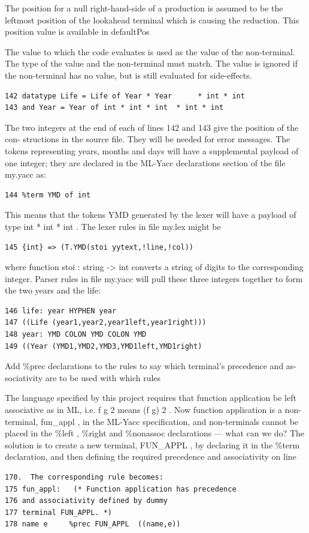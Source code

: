 \documentclass[8pt, a4paper, oneside, twocolumn]{extarticle}
\begin{document}
The position for a null right-hand-side of a production is assumed to be the leftmost
position of the lookahead terminal which is causing the reduction.  This position value
is available in
defaultPos

The  value  to  which  the  code  evaluates  is  used  as  the  value  of  the  non-terminal.
The type of the value and the non-terminal must match.  The value is ignored if the
non-terminal has no value, but is still evaluated for side-effects.

\begin{verbatim}
142 datatype Life = Life of Year * Year      * int * int
143 and Year = Year of int * int * int  * int * int
\end{verbatim}
The two integers at the end of each of lines 142 and 143 give the position of the con-
structions in the source file.  They will be needed for error messages.
The tokens representing years, months and days will have a supplemental payload
of one integer; they are declared in the ML-Yacc declarations section of the file
my.yacc
as:
\begin{verbatim}
144 %term YMD of int
\end{verbatim}
This means that the tokens
YMD
generated by the lexer will have a payload of type
int
* int * int
.  The lexer rules in file
my.lex
might be
\begin{verbatim}
145 {int} => (T.YMD(stoi yytext,!line,!col))
\end{verbatim}
where function
stoi :  string -> int
converts a string of digits to the corresponding
integer.
Parser rules in file
my.yacc
will pull these three integers together to form the two
years and the life:
\begin{verbatim}
146 life: year HYPHEN year
147 ((Life (year1,year2,year1left,year1right)))
148 year: YMD COLON YMD COLON YMD
149 ((Year (YMD1,YMD2,YMD3,YMD1left,YMD1right)
\end{verbatim}


Add
\%prec
declarations to the rules to say which terminal’s precedence and as-
sociativity  are  to  be  used  with  which  rules

The language specified by this project requires that function application be left
associative  as  in  ML, i.e.
f g 2
means
(f g) 2
.   Now  function  application  is  a
non-terminal,
fun\_appl
, in the ML-Yacc specification, and non-terminals cannot
be placed in the
\%left
,
\%right
and
\%nonassoc
declarations — what can we do?
The solution is to create a new terminal,
FUN\_APPL
, by declaring it in the
\%term
declaration,  and then defining the required precedence and associativity on line
\begin{verbatim}
170.  The corresponding rule becomes:
175 fun_appl:   (* Function application has precedence
176 and associativity defined by dummy
177 terminal FUN_APPL. *)
178 name e     %prec FUN_APPL  ((name,e))
\end{verbatim}
\end{document}
